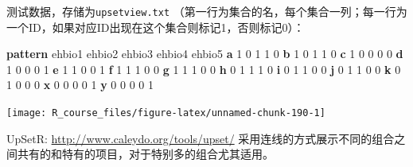 \documentclass[]{article}
\newenvironment{Shaded}{\begin{snugshade}}{\end{snugshade}}
\newcommand{\KeywordTok}[1]{\textcolor[rgb]{0.13,0.29,0.53}{\textbf{{#1}}}}
\newcommand{\DataTypeTok}[1]{\textcolor[rgb]{0.13,0.29,0.53}{{#1}}}
\newcommand{\DecValTok}[1]{\textcolor[rgb]{0.00,0.00,0.81}{{#1}}}
\newcommand{\CharTok}[1]{\textcolor[rgb]{0.31,0.60,0.02}{{#1}}}
\newcommand{\StringTok}[1]{\textcolor[rgb]{0.31,0.60,0.02}{{#1}}}
\newcommand{\CommentTok}[1]{\textcolor[rgb]{0.56,0.35,0.01}{\textit{{#1}}}}
\newcommand{\OtherTok}[1]{\textcolor[rgb]{0.56,0.35,0.01}{{#1}}}
\newcommand{\NormalTok}[1]{{#1}}
\numberwithin{figure}{section}
\numberwithin{table}{section}
\theoremstyle{definition}
\theoremstyle{definition}
\theoremstyle{definition}
\theoremstyle{remark}
\begin{document}
测试数据，存储为\texttt{upsetview.txt}
（第一行为集合的名，每个集合一列；每一行为一个ID，如果对应ID出现在这个集合则标记1，否则标记0）：

\begin{Shaded}
\begin{Highlighting}[]
\KeywordTok{pattern} \NormalTok{ehbio1  ehbio2  ehbio3  ehbio4  ehbio5}
\KeywordTok{a}   \NormalTok{1   0   1   1   0}
\KeywordTok{b}   \NormalTok{1   0   1   1   0}
\KeywordTok{c}   \NormalTok{1   0   0   0   0}
\KeywordTok{d}   \NormalTok{1   0   0   0   1}
\KeywordTok{e}   \NormalTok{1   1   0   0   1}
\KeywordTok{f}   \NormalTok{1   1   1   0   0}
\KeywordTok{g}   \NormalTok{1   1   1   0   0}
\KeywordTok{h}   \NormalTok{0   1   1   1   0}
\KeywordTok{i}   \NormalTok{0   1   1   0   0}
\KeywordTok{j}   \NormalTok{0   1   1   0   0}
\KeywordTok{k}   \NormalTok{0   1   0   0   0}
\KeywordTok{x}   \NormalTok{0   0   0   0   1}
\KeywordTok{y}   \NormalTok{0   0   0   0   1}
\end{Highlighting}
\end{Shaded}

\begin{Shaded}
\end{Shaded}

\begin{center}\texttt{[image: R\_course\_files/figure-latex/unnamed-chunk-190-1]} \end{center}

UpSetR: \url{http://www.caleydo.org/tools/upset/}
采用连线的方式展示不同的组合之间共有的和特有的项目，对于特别多的组合尤其适用。
\end{document}

